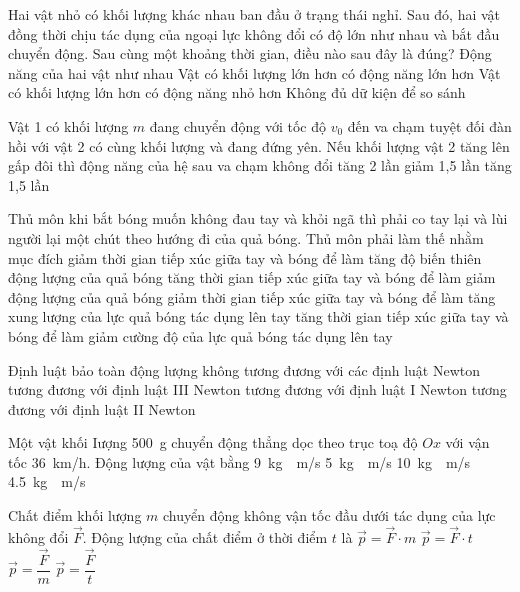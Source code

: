 \begin{ex}
	Hai vật nhỏ có khối lượng khác nhau ban đầu ở trạng thái nghỉ. Sau đó, hai vật đồng thời chịu tác dụng của ngoại lực không đổi có độ lớn như nhau và bắt đầu chuyển động. Sau cùng một khoảng thời gian, điều nào sau đây là đúng?
	\choice
	{Động năng của hai vật như nhau}
	{Vật có khối lượng lớn hơn có động năng lớn hơn}
	{\True Vật có khối lượng lớn hơn có động năng nhỏ hơn}
	{Không đủ dữ kiện để so sánh}
	\loigiai{}
\end{ex}
\begin{ex}
	Vật 1 có khối lượng $m$ đang chuyển động với tốc độ $v_0$ đến va chạm tuyệt đối đàn hồi với vật 2 có cùng khối lượng và đang đứng yên. Nếu khối lượng vật 2 tăng lên gấp đôi thì động năng của hệ sau va chạm
	\choice
	{\True không đổi}
	{tăng 2 lần}
	{giảm 1,5 lần}
	{tăng 1,5 lần}
	\loigiai{}
\end{ex}
\begin{ex}
	Thủ môn khi bắt bóng muốn không đau tay và khỏi ngã thì phải co tay lại và lùi người lại một chút theo hướng đi của quả bóng. Thủ môn phải làm thế nhằm mục đích
	\choice
	{giảm thời gian tiếp xúc giữa tay và bóng để làm tăng độ biến thiên động lượng của quả bóng}
	{tăng thời gian tiếp xúc giữa tay và bóng để làm giảm động lượng của quả bóng}
	{giảm thời gian tiếp xúc giữa tay và bóng để làm tăng xung lượng của lực quả bóng tác dụng lên tay}
	{\True tăng thời gian tiếp xúc giữa tay và bóng để làm giảm cường độ của lực quả bóng tác dụng lên tay}
	\loigiai{}
\end{ex}
\begin{ex}
	Định luật bảo toàn động lượng
	\choice
	{không tương đương với các định luật Newton}
	{\True tương đương với định luật III Newton}
	{tương đương với định luật I Newton}
	{tương đương với định luật II Newton}
	\loigiai{}
\end{ex}
\begin{ex}
	Một vật khối Iượng \SI{500}{\gram} chuyển động thẳng dọc theo trục toạ độ $Ox$ với vận tốc \SI{36}{\kilo\meter/\hour}. Động lượng của vật bằng
	\choice
	{\SI{9}{\kilogram\cdot\meter/\second}}
	{\True \SI{5}{\kilogram\cdot\meter/\second}}
	{\SI{10}{\kilogram\cdot\meter/\second}}
	{\SI{4.5}{\kilogram\cdot\meter/\second}}
	\loigiai{}
\end{ex}
\begin{ex}
	Chất điểm khối lượng $m$ chuyển động không vận tốc đầu dưới tác dụng của lực không đổi $\vec{F}$. Động lượng của chất điểm ở thời điểm $t$ là
	\choice
	{$\vec{p}=\vec{F}\cdot m$}
	{\True $\vec{p}=\vec{F}\cdot t$}
	{$\vec{p}=\dfrac{\vec{F}}{m}$}
	{$\vec{p}=\dfrac{\vec{F}}{t}$}
	\loigiai{}
\end{ex}

